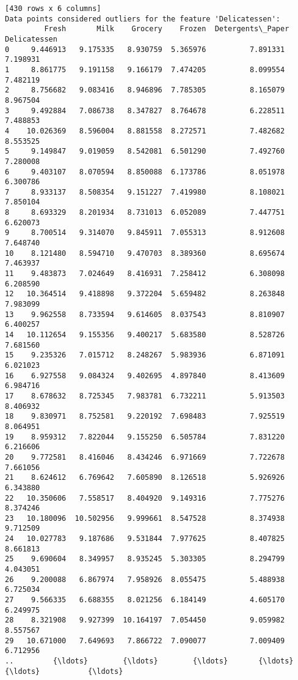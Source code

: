 \documentclass[11pt]{article}
\begin{document}
\begin{Verbatim}[commandchars=\\\{\}]
[430 rows x 6 columns]
Data points considered outliers for the feature 'Delicatessen':
         Fresh       Milk    Grocery    Frozen  Detergents\_Paper  Delicatessen
0     9.446913   9.175335   8.930759  5.365976          7.891331      7.198931
1     8.861775   9.191158   9.166179  7.474205          8.099554      7.482119
2     8.756682   9.083416   8.946896  7.785305          8.165079      8.967504
3     9.492884   7.086738   8.347827  8.764678          6.228511      7.488853
4    10.026369   8.596004   8.881558  8.272571          7.482682      8.553525
5     9.149847   9.019059   8.542081  6.501290          7.492760      7.280008
6     9.403107   8.070594   8.850088  6.173786          8.051978      6.300786
7     8.933137   8.508354   9.151227  7.419980          8.108021      7.850104
8     8.693329   8.201934   8.731013  6.052089          7.447751      6.620073
9     8.700514   9.314070   9.845911  7.055313          8.912608      7.648740
10    8.121480   8.594710   9.470703  8.389360          8.695674      7.463937
11    9.483873   7.024649   8.416931  7.258412          6.308098      6.208590
12   10.364514   9.418898   9.372204  5.659482          8.263848      7.983099
13    9.962558   8.733594   9.614605  8.037543          8.810907      6.400257
14   10.112654   9.155356   9.400217  5.683580          8.528726      7.681560
15    9.235326   7.015712   8.248267  5.983936          6.871091      6.021023
16    6.927558   9.084324   9.402695  4.897840          8.413609      6.984716
17    8.678632   8.725345   7.983781  6.732211          5.913503      8.406932
18    9.830971   8.752581   9.220192  7.698483          7.925519      8.064951
19    8.959312   7.822044   9.155250  6.505784          7.831220      6.216606
20    9.772581   8.416046   8.434246  6.971669          7.722678      7.661056
21    8.624612   6.769642   7.605890  8.126518          5.926926      6.343880
22   10.350606   7.558517   8.404920  9.149316          7.775276      8.374246
23   10.180096  10.502956   9.999661  8.547528          8.374938      9.712509
24   10.027783   9.187686   9.531844  7.977625          8.407825      8.661813
25    9.690604   8.349957   8.935245  5.303305          8.294799      4.043051
26    9.200088   6.867974   7.958926  8.055475          5.488938      6.725034
27    9.566335   6.688355   8.021256  6.184149          4.605170      6.249975
28    8.321908   9.927399  10.164197  7.054450          9.059982      8.557567
29   10.671000   7.649693   7.866722  7.090077          7.009409      6.712956
..         {\ldots}        {\ldots}        {\ldots}       {\ldots}               {\ldots}           {\ldots}

\end{Verbatim}
\end{document}
